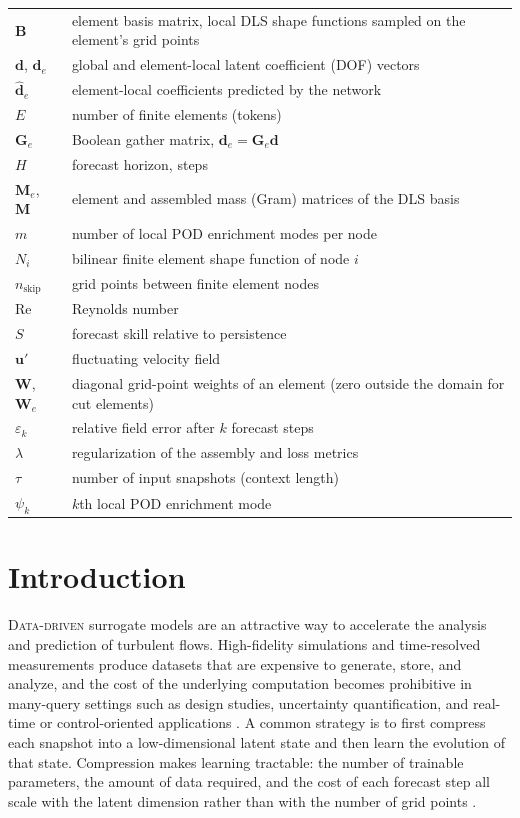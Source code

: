 \documentclass[conf]{new-aiaa}
\newcommand{\Rey}{\mathrm{Re}}
\newcommand{\dvec}{\mathbf{d}}
\newcommand{\dhat}{\hat{\mathbf{d}}}
\begin{document}
{\renewcommand\arraystretch{1.0}
\noindent\begin{longtable*}{@{}l @{\quad=\quad} l@{}}
$\mathbf{B}$ & element basis matrix, local DLS shape functions sampled on the element's grid points \\
$\dvec$, $\dvec_e$ & global and element-local latent coefficient (DOF) vectors \\
$\dhat_e$ & element-local coefficients predicted by the network \\
$E$ & number of finite elements (tokens) \\
$\mathbf{G}_e$ & Boolean gather matrix, $\dvec_e = \mathbf{G}_e\dvec$ \\
$H$ & forecast horizon, steps \\
$\mathbf{M}_e$, $\mathbf{M}$ & element and assembled mass (Gram) matrices of the DLS basis \\
$m$ & number of local POD enrichment modes per node \\
$N_i$ & bilinear finite element shape function of node $i$ \\
$n_\mathrm{skip}$ & grid points between finite element nodes \\
$\Rey$ & Reynolds number \\
$S$ & forecast skill relative to persistence \\
$\mathbf{u}'$ & fluctuating velocity field \\
$\mathbf{W}$, $\mathbf{W}_e$ & diagonal grid-point weights of an element (zero outside the domain for cut elements) \\
$\varepsilon_k$ & relative field error after $k$ forecast steps \\
$\lambda$ & regularization of the assembly and loss metrics \\
$\tau$ & number of input snapshots (context length) \\
$\psi_k$ & $k$th local POD enrichment mode
\end{longtable*}}

\section{Introduction}
\lettrine{D}{ata-driven} surrogate models are an attractive way to accelerate the analysis and prediction of turbulent flows. High-fidelity simulations and time-resolved measurements produce datasets that are expensive to generate, store, and analyze, and the cost of the underlying computation becomes prohibitive in many-query settings such as design studies, uncertainty quantification, and real-time or control-oriented applications \cite{benner2015survey}. A common strategy is to first compress each snapshot into a low-dimensional latent state and then learn the evolution of that state. Compression makes learning tractable: the number of trainable parameters, the amount of data required, and the cost of each forecast step all scale with the latent dimension rather than with the number of grid points \cite{brunton2020ml,vinuesa2022enhancing,brunton2024promising}.
\end{document}
